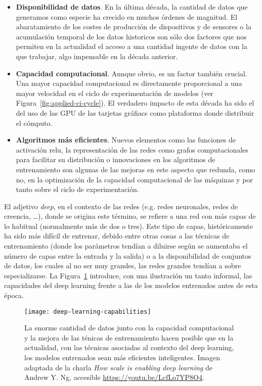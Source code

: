 \begin{itemize}
	\item \textbf{Disponibilidad de datos}. En la última década, la cantidad de datos que generamos como especie ha crecido en muchos órdenes de magnitud. El abaratamiento de los costes de producción de dispositivos y de sensores o la acumulación temporal de los datos historicos son sólo dos factores que nos permiten en la actualidad el acceso a una cantidad ingente de datos con la que trabajar, algo impensable en la década anterior.
	\item \textbf{Capacidad computacional}. Aunque obvio, es un factor también crucial. Una mayor capacidad computacional es directamente proporcional a una mayor velocidad en el ciclo de experimentación de modelos (ver Figura~\ref{fig:applied-ci-cycle}). El verdadero impacto de esta década ha sido el del uso de las GPU de las tarjetas gráfiacs como plataforma donde distribuir el cómputo.
	\item \textbf{Algoritmos más eficientes}. Nuevos elementos como las funciones de activación \gls{relu}, la representación de las redes como grafos computacionales para facilitar su distribución o innovaciones en los algoritmos de entrenamiento son algunas de las mejoras en este aspecto que redunda, como no, en la optimización de la capacidad computacional de las máquinas y por tanto sobre el ciclo de experimentación.
\end{itemize}

El adjetivo \textit{deep}, en el contexto de las redes (e.g. redes neuronales, redes de creencia, \ldots), donde se origina este término, se refiere a una red con más capas de lo habitual (normalmente más de dos o tres). Este tipo de capas, históricamente ha sido más difícil de entrenar, debido entre otras cosas a las técnicas de entrenamiento (donde los parámetros tendían a diluirse según se aumentaba el número de capas entre la entrada y la salida) o a la disponibilidad de conjuntos de datos, los cuales al no ser muy grandes, las redes grandes tendían a sobre especializarse. La Figura~\ref{fig:deep-learning-capabilities} introduce, con una ilustración un tanto informal, las capacidades del deep learning frente a las de los modelos entrenados antes de esta época.

\begin{figure}[h]
	\texttt{[image: deep-learning-capabilities]}
	\caption[Capacidad de los modelos en función de la cantidad de datos]{La enorme cantidad de datos junto con la capacidad computacional y la mejora de las ténicas de entrenamiento hacen posible que en la actualidad, con las técnicas asociadas al contexto del deep learning, los modelos entrenados sean más eficientes  inteligentes. Imagen adaptada de la charla \textit{How scale is enabling deep learning} de Andrew Y. Ng, accesible \url{https://youtu.be/LcfLo7YP8O4}.}
	\label{fig:deep-learning-capabilities}
\end{figure}

